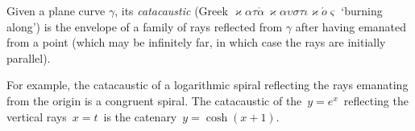\documentclass[12pt]{article}
\theoremstyle{definition}
\begin{document}
Given a plane curve $\gamma$, its \emph{catacaustic} (Greek $\varkappa\alpha\tau\acute{\alpha}\, \varkappa\alpha\upsilon\sigma\tau\iota\varkappa \acute{o}\varsigma$ `burning along') is the envelope of a family of rays reflected from $\gamma$ after having emanated from a  point (which may be infinitely far, in which case the rays are initially parallel).

For example, the catacaustic of a logarithmic spiral reflecting the rays emanating from the origin is a congruent spiral.\; The catacaustic of the  \,$y = e^x$\, reflecting the vertical rays \,$x = t$\, is the catenary \,$y = \cosh(x\!+\!1)$.
\end{document}
